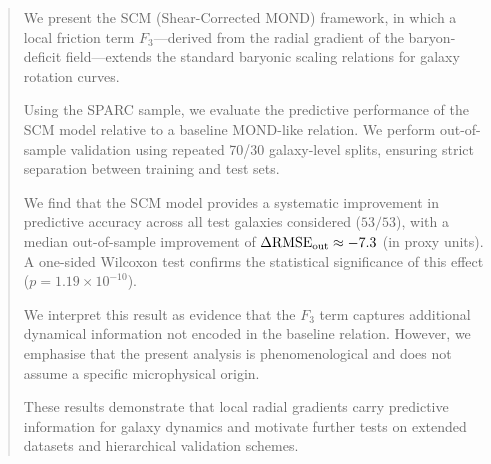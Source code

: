 
\begin{abstract}
We present the SCM (Shear-Corrected MOND) framework, in which a local
friction term $F_3$---derived from the radial gradient of the
baryon-deficit field---extends the standard baryonic scaling relations
for galaxy rotation curves.

Using the SPARC sample, we evaluate the predictive performance of the
SCM model relative to a baseline MOND-like relation.  We perform
out-of-sample validation using repeated 70/30 galaxy-level splits,
ensuring strict separation between training and test sets.

We find that the SCM model provides a systematic improvement in
predictive accuracy across all test galaxies considered ($53/53$),
with a median out-of-sample improvement of
$\Delta\mathrm{RMSE}_{\rm out} \approx -7.3$ (in proxy units).
A one-sided Wilcoxon test confirms the statistical significance of
this effect ($p = 1.19\times10^{-10}$).

We interpret this result as evidence that the $F_3$ term captures
additional dynamical information not encoded in the baseline relation.
However, we emphasise that the present analysis is phenomenological
and does not assume a specific microphysical origin.

These results demonstrate that local radial gradients carry
predictive information for galaxy dynamics and motivate further
tests on extended datasets and hierarchical validation schemes.
\end{abstract}
